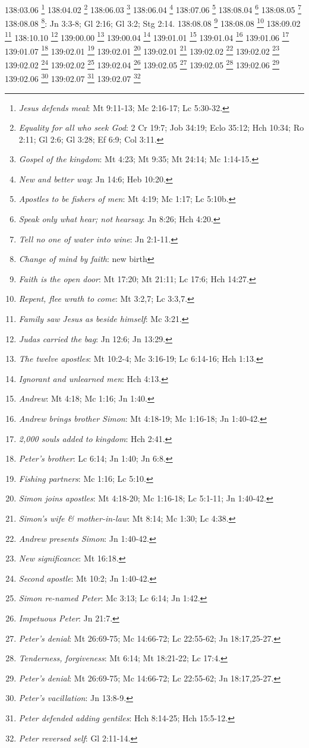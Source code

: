{{{{{{{138:03.06 \footnote{\textit{Jesus defends meal}: Mt 9:11-13; Mc 2:16-17; Lc 5:30-32.}
138:04.02 \footnote{\textit{Equality for all who seek God}: 2 Cr 19:7; Job 34:19; Eclo 35:12; Hch 10:34; Ro 2:11; Gl 2:6; Gl 3:28; Ef 6:9; Col 3:11.}
138:06.03 \footnote{\textit{Gospel of the kingdom}: Mt 4:23; Mt 9:35; Mt 24:14; Mc 1:14-15.}
138:06.04 \footnote{\textit{New and better way}: Jn 14:6; Heb 10:20.}
138:07.06 \footnote{\textit{Apostles to be fishers of men}: Mt 4:19; Mc 1:17; Lc 5:10b.}
138:08.04 \footnote{\textit{Speak only what hear; not hearsay}: Jn 8:26; Hch 4:20.}
138:08.05 \footnote{\textit{Tell no one of water into wine}: Jn 2:1-11.}
138:08.08 \footnote{\textit{Change of mind by faith}: new birth}: Jn 3:3-8; Gl 2:16; Gl 3:2; Stg 2:14.}
138:08.08 \footnote{\textit{Faith is the open door}: Mt 17:20; Mt 21:11; Lc 17:6; Hch 14:27.}
138:08.08 \footnote{\textit{Repent, flee wrath to come}: Mt 3:2,7; Lc 3:3,7.}
138:09.02 \footnote{\textit{Family saw Jesus as beside himself}: Mc 3:21.}
138:10.10 \footnote{\textit{Judas carried the bag}: Jn 12:6; Jn 13:29.}
139:00.00 \footnote{\textit{The twelve apostles}: Mt 10:2-4; Mc 3:16-19; Lc 6:14-16; Hch 1:13.}
139:00.04 \footnote{\textit{Ignorant and unlearned men}: Hch 4:13.}
139:01.01 \footnote{\textit{Andrew}: Mt 4:18; Mc 1:16; Jn 1:40.}
139:01.04 \footnote{\textit{Andrew brings brother Simon}: Mt 4:18-19; Mc 1:16-18; Jn 1:40-42.}
139:01.06 \footnote{\textit{2,000 souls added to kingdom}: Hch 2:41.}
139:01.07 \footnote{\textit{Peter's brother}: Lc 6:14; Jn 1:40; Jn 6:8.}
139:02.01 \footnote{\textit{Fishing partners}: Mc 1:16; Lc 5:10.}
139:02.01 \footnote{\textit{Simon joins apostles}: Mt 4:18-20; Mc 1:16-18; Lc 5:1-11; Jn 1:40-42.}
139:02.01 \footnote{\textit{Simon's wife & mother-in-law}: Mt 8:14; Mc 1:30; Lc 4:38.}
139:02.02 \footnote{\textit{Andrew presents Simon}: Jn 1:40-42.}
139:02.02 \footnote{\textit{New significance}: Mt 16:18.}
139:02.02 \footnote{\textit{Second apostle}: Mt 10:2; Jn 1:40-42.}
139:02.02 \footnote{\textit{Simon re-named Peter}: Mc 3:13; Lc 6:14; Jn 1:42.}
139:02.04 \footnote{\textit{Impetuous Peter}: Jn 21:7.}
139:02.05 \footnote{\textit{Peter's denial}: Mt 26:69-75; Mc 14:66-72; Lc 22:55-62; Jn 18:17,25-27.}
139:02.05 \footnote{\textit{Tenderness, forgiveness}: Mt 6:14; Mt 18:21-22; Lc 17:4.}
139:02.06 \footnote{\textit{Peter's denial}: Mt 26:69-75; Mc 14:66-72; Lc 22:55-62; Jn 18:17,25-27.}
139:02.06 \footnote{\textit{Peter's vacillation}: Jn 13:8-9.}
139:02.07 \footnote{\textit{Peter defended adding gentiles}: Hch 8:14-25; Hch 15:5-12.}
139:02.07 \footnote{\textit{Peter reversed self}: Gl 2:11-14.}
}}}}}}
